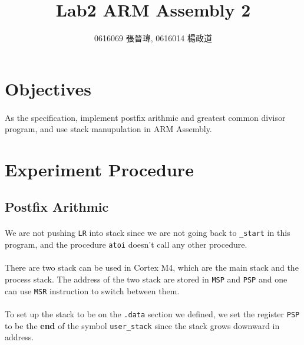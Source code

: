 \title{Lab2 ARM Assembly 2}
\author{0616069 張晉瑋, 0616014 楊政道}
\maketitle
\thispagestyle{fancy}
\section{Objectives}
\paragraph{}
As the specification, implement postfix arithmic and greatest common divisor program, and use stack manupulation in ARM Assembly.
\section{Experiment Procedure}
\subsection{Postfix Arithmic}
\paragraph{}
We are not pushing \texttt{LR} into stack since we are not going back to \texttt{\_start} in this program, and the procedure \texttt{atoi} doesn't call any other procedure.
\paragraph{}
There are two stack can be used in Cortex M4, which are the main stack and the process stack. The address of the two stack are stored in \texttt{MSP} and \texttt{PSP} and one can use \texttt{MSR} instruction to switch between them.
\paragraph{}
To set up the stack to be on the \texttt{.data} section we defined, we set the register \texttt{PSP} to be the \textbf{end} of the symbol \texttt{user\_stack} since the stack grows downward in address.
